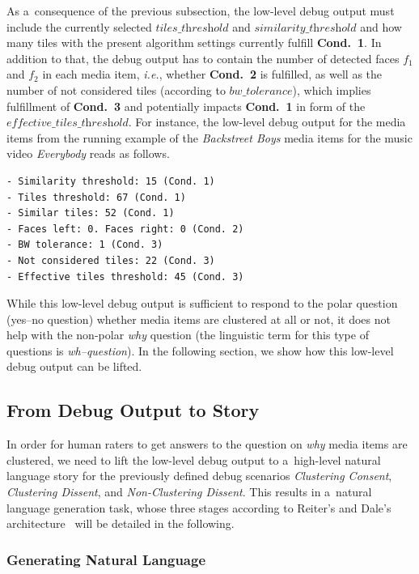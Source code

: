 As a~consequence of the previous subsection, the low-level debug output
must include the currently selected $\textit{tiles\_threshold}$ and
$\textit{similarity\_threshold}$ and how many tiles with the present algorithm settings
currently fulfill \textbf{Cond.~1}.
In addition to that, the debug output has to contain
the number of detected faces $f_1$ and $f_2$ in each media item,
\emph{i.e.}, whether \textbf{Cond.~2} is fulfilled,
as well as the number of not considered tiles
(according to $\textit{bw\_tolerance}$), which implies fulfillment of \textbf{Cond.~3}
and potentially impacts \textbf{Cond.~1} in form of
the $\textit{effective\_tiles\_threshold}$.
For instance, the low-level debug output for the media items
from the running example of the \emph{Backstreet Boys} media items
for the music video \emph{Everybody} reads as follows.

\begin{verbatim}
- Similarity threshold: 15 (Cond. 1)
- Tiles threshold: 67 (Cond. 1)
- Similar tiles: 52 (Cond. 1)
- Faces left: 0. Faces right: 0 (Cond. 2)
- BW tolerance: 1 (Cond. 3)
- Not considered tiles: 22 (Cond. 3)
- Effective tiles threshold: 45 (Cond. 3)
\end{verbatim}

While this low-level debug output is sufficient to respond
to the polar question (yes--no question) whether media items
are clustered at all or not, it does not help with
the non-polar \emph{why} question
(the linguistic term for this type of questions is \emph{wh–question}).
In the following section, we show how
this low-level debug output can be lifted.

\subsection{From Debug Output to Story}
\label{sec:from-debug-output-to-story}

In order for human raters to get answers to the question on
\emph{why} media items are clustered, we need to lift the low-level debug output
to a~high-level natural language story for
the previously defined debug scenarios \textit{Clustering Consent},
\textit{Clustering Dissent}, and \textit{Non-Clustering Dissent}.
This results in a~natural language generation task,
whose three stages according to Reiter's and Dale's
architecture~\cite{reiter2000building} will be detailed in the following.

\subsubsection{Generating Natural Language}
\label{sec:text-to-speech-espeak}

